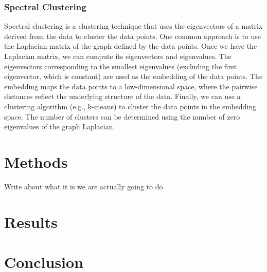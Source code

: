 \documentclass[12pt]{amsart}
\begin{document}
\subsubsection{Spectral Clustering}
Spectral clustering is a clustering technique that uses the eigenvectors of a matrix derived from the data to cluster the data points. One common approach is to use the Laplacian matrix of the graph defined by the data points. Once we have the Laplacian matrix, we can compute its eigenvectors and eigenvalues. The eigenvectors corresponding to the smallest eigenvalues (excluding the first eigenvector, which is constant) are used as the embedding of the data points. The embedding maps the data points to a low-dimensional space, where the pairwise distances reflect the underlying structure of the data. Finally, we can use a clustering algorithm (e.g., k-means) to cluster the data points in the embedding space. The number of clusters can be determined using the number of zero eigenvalues of the graph Laplacian.

\section{Methods}
Write about what it is we are actually going to do

\section{Results}

\section{Conclusion}




\end{document}
